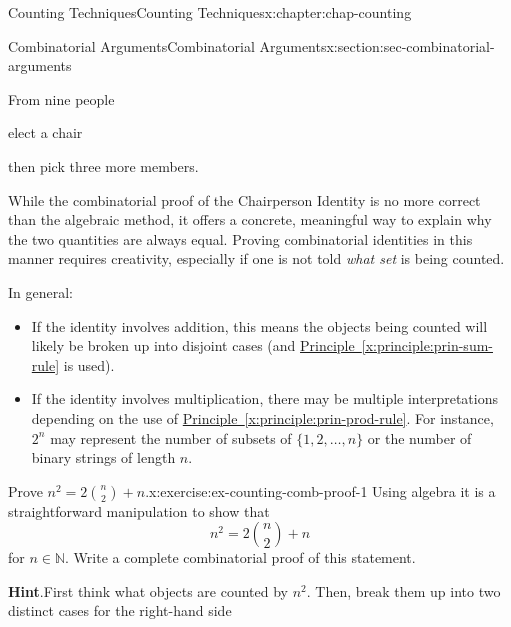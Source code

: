 \documentclass[oneside,10pt,]{book}
\newcommand{\blocktitlefont}{\relax}
\newcommand{\xreffont}{\relax}
\numberwithin{equation}{section}
\begin{document}
\begin{chapterptx}{Counting Techniques}{}{Counting Techniques}{}{}{x:chapter:chap-counting}
\begin{sectionptx}{Combinatorial Arguments}{}{Combinatorial Arguments}{}{}{x:section:sec-combinatorial-arguments}
\begin{sidebyside}{3}{0.085}{0.085}{0.17}
\begin{sbspanel}{0.17}
{
}%
\end{sbspanel}%
\end{sidebyside}%
\begin{sidebyside}{3}{0.085}{0.085}{0.17}%
\begin{sbspanel}{0.15}%
From nine people%
\end{sbspanel}%
\begin{sbspanel}{0.17}%
\par
elect a chair%
\end{sbspanel}%
\begin{sbspanel}{0.17}%
\par
then pick three more members.%
\end{sbspanel}%
\end{sidebyside}%
\par
While the combinatorial proof of the Chairperson Identity is no more correct than the algebraic method, it offers a concrete, meaningful way to explain why the two quantities are always equal. Proving combinatorial identities in this manner requires creativity, especially if one is not told \emph{what set} is being counted.%
\par
In general:%
\begin{itemize}[label=\textbullet]
\item{}If the identity involves addition, this means the objects being counted will likely be broken up into disjoint cases (and \hyperref[x:principle:prin-sum-rule]{Principle~{\xreffont\ref{x:principle:prin-sum-rule}}} is used).%
\item{}If the identity involves multiplication, there may be multiple interpretations depending on the use of \hyperref[x:principle:prin-prod-rule]{Principle~{\xreffont\ref{x:principle:prin-prod-rule}}}. For instance, \(2^n\) may represent the number of subsets of \(\{1,2,\ldots,n\}\) or the number of binary strings of length \(n\).%
\end{itemize}
%
\begin{inlineexercise}{Prove \(n^2 = 2\binom{n}{2} + n\).}{x:exercise:ex-counting-comb-proof-1}%
Using algebra it is a straightforward manipulation to show that%
\begin{equation*}
n^2 = 2\binom{n}{2} + n
\end{equation*}
for \(n \in \mathbb{N}\). Write a complete combinatorial proof of this statement.%
\par\smallskip%
\noindent\textbf{\blocktitlefont Hint}.\hypertarget{g:hint:id527760}{}\quad{}First think what objects are counted by \(n^2\). Then, break them up into two distinct cases for the right-hand side%

\end{inlineexercise}
\end{sectionptx}
\end{chapterptx}
\end{document}
